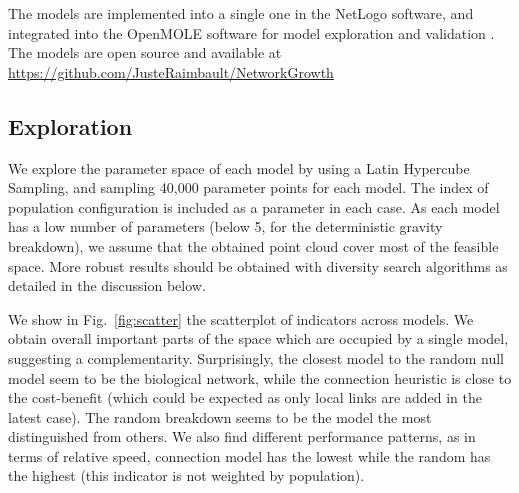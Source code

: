 \documentclass{article}
\begin{document}
The models are implemented into a single one in the NetLogo software, and integrated into the OpenMOLE software for model exploration and validation \cite{reuillon2013openmole}. The models are open source and available at \url{https://github.com/JusteRaimbault/NetworkGrowth}

  
  
  

\subsection{Exploration}

We explore the parameter space of each model by using a Latin Hypercube Sampling, and sampling 40,000 parameter points for each model. The index of population configuration is included as a parameter in each case. As each model has a low number of parameters (below 5, for the deterministic gravity breakdown), we assume that the obtained point cloud cover most of the feasible space. More robust results should be obtained with diversity search algorithms as detailed in the discussion below.

We show in Fig.~\ref{fig:scatter} the scatterplot of indicators across models. We obtain overall important parts of the space which are occupied by a single model, suggesting a complementarity. Surprisingly, the closest model to the random null model seem to be the biological network, while the connection heuristic is close to the cost-benefit (which could be expected as only local links are added in the latest case). The random breakdown seems to be the model the most distinguished from others. We also find different performance patterns, as in terms of relative speed, connection model has the lowest while the random has the highest (this indicator is not weighted by population).
\end{document}
